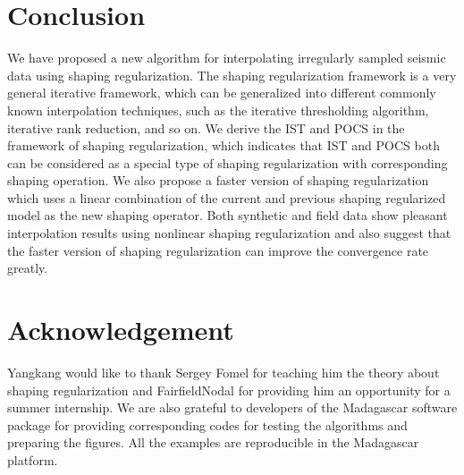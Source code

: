 \section{Conclusion}
We have proposed a new algorithm for interpolating irregularly sampled seismic data using shaping regularization. The shaping regularization framework is a very general iterative framework, which can be generalized into different commonly known interpolation techniques, such as the iterative thresholding algorithm, iterative rank reduction, and so on. We derive the IST and POCS in the framework of shaping regularization, which indicates that IST and POCS both can be considered as a special type of shaping regularization with corresponding shaping operation. We also propose a faster version of shaping regularization which uses a linear combination of the current and previous shaping regularized model as the new shaping operator. Both synthetic and field data show pleasant interpolation results using nonlinear shaping regularization and also suggest that the faster version of shaping regularization can improve the convergence rate greatly. 

\section{Acknowledgement}
Yangkang would like to thank Sergey Fomel for teaching him the theory about shaping regularization and FairfieldNodal for providing him an opportunity for a summer internship. We are also grateful to developers of the Madagascar software package \cite[]{mada2013} for providing corresponding codes for testing the algorithms and preparing the figures. All the examples are reproducible in the Madagascar platform.


\onecolumn





